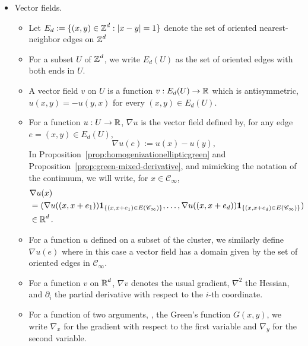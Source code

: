 \documentclass[12pt]{amsart}
\numberwithin{equation}{section}
\begin{document}
\begin{itemize}
\begin{itemize}
			\item For $p \in [1, \infty)$ we denote the $L^p$ and normalized $L^p$ norms of $w$ by 
			\[
			\|w\|_{L^p(U)} :=  \left( \sum_{x \in U} |w(x)|^p dx \right)^{1/p} \quad \mbox{and} \quad 
			\|w\|_{\underline{L}^p(U)} :=  \left( \frac{1}{|U|} \sum_{x \in U} |w(x)|^p dx \right)^{1/p}
			\]
			and $\|w\|_{L^{\infty}(U)} = \sup_{x \in U} |w(x)|$.
			\item The oscillation of a function $w$ over a finite subset $U$ is denoted by 
			\[
			\osc_{U} w := \sup_{x \in U} w(x) - \inf_{x \in U} w(x)
			\]
			and its average is  
			\[
			(w)_{U} := \frac{1}{|U|} \sum_{x \in U} w(x) dx.  
			\]
		\end{itemize}
		\item Vector fields.
		\begin{itemize}
			\item Let $E_d := \{ (x,y) \in \operatorname{\mathbb{Z}}^d : |x-y| = 1 \}$ denote the set of oriented nearest-neighbor edges on $\operatorname{\mathbb{Z}}^d$ 
			\item For a subset $U$ of $\operatorname{\mathbb{Z}}^d$, we write $E_d(U)$ as the set of oriented edges with both ends in $U$. 
			\item A vector field $v$ on $U$ is a function $v: E_d(U) \to \operatorname{\mathbb{R}}$ which is antisymmetric, $u(x,y) = -u(y,x)$ 
			for every $(x,y) \in E_d(U)$.
			\item For a function $u: U \to \operatorname{\mathbb{R}}$, $\nabla u$ is the vector field defined by, for any edge $e = (x , y) \in E_d(U)$,
			\begin{equation} \label{id:vectorfiedledges}
				\nabla u(e) := u(x) - u(y),
			\end{equation}
			In Proposition~\ref{prop:homogenizationellipticgreen} and Proposition~\ref{prop:green-mixed-derivative}, and mimicking the notation of the continuum, we will write, for $x \in \mathscr{C}_\infty$, 
			\begin{align*}
				&\nabla u(x)  \\
				&=(\nabla u((x, x + e_1)) {\boldsymbol{1}}_{\{ (x, x+e_1) \in E(\mathscr{C}_\infty) \}}, \ldots, \nabla u((x, x + e_d)) {\boldsymbol{1}}_{\{ (x, x+e_d) \in E(\mathscr{C}_\infty) \}} ) \\
				&\in \operatorname{\mathbb{R}}^d.
			\end{align*}
			\item For a function $u$ defined on a subset of the cluster, we similarly define $\nabla u(e)$
			where in this case a vector field has a domain given by the set of oriented edges in $\mathscr{C}_{\infty}$.
			\item For a function $v$ on $\operatorname{\mathbb{R}}^d$, $\nabla v$ denotes the usual gradient, $\nabla^2$ the Hessian, 
			and $\partial_{i}$ the partial derivative with respect to the $i$-th coordinate.
			\item For a function of two arguments, \eg, the Green's function $G(x,y)$, we write $\nabla_x$ for the gradient with respect
			to the first variable and $\nabla_y$ for the second variable.
		\end{itemize}    
	\end{itemize}
	
\end{document}
